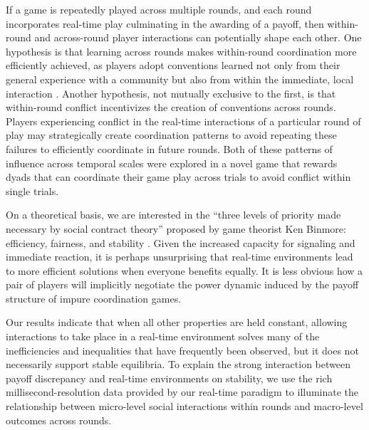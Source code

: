 \documentclass[10pt,letterpaper]{article}
\begin{document}
If a game is repeatedly played across multiple rounds, and each round incorporates real-time play culminating in the awarding of a payoff, then within-round and across-round player interactions can potentially shape each other. One hypothesis is that learning across rounds makes within-round coordination more efficiently achieved, as players adopt conventions learned not only from their general experience with a community \cite{JacksonXing14_CultureDependentStrategies} but also from within the immediate, local interaction \cite{FreyGoldstone13_CyclicGameDynamics, GarrodAnderson87_SayingWhatYouMean, BrennanClark96_ConceptualPactsConversation}. Another hypothesis, not mutually exclusive to the first, is that within-round conflict incentivizes the creation of conventions across rounds. Players experiencing conflict in the real-time interactions of a particular round of play may strategically create coordination patterns to avoid repeating these failures to efficiently coordinate in future rounds.  Both of these patterns of influence across temporal scales were explored in a novel game that rewards dyads that can coordinate their game play across trials to avoid conflict within single trials.

On a theoretical basis, we are interested in the ``three levels of priority made necessary by social contract theory'' proposed by game theorist Ken Binmore: efficiency, fairness, and stability \cite{Binmore05_NaturalJustice}. Given the increased capacity for signaling and immediate reaction, it is perhaps unsurprising that real-time environments lead to more efficient solutions when everyone benefits equally. It is less obvious how a pair of players will implicitly negotiate the power dynamic induced by the payoff structure of impure coordination games. 

Our results indicate that when all other properties are held constant, allowing interactions to take place in a real-time environment solves many of the inefficiencies and inequalities that have frequently been observed, but it does not necessarily support stable equilibria. To explain the strong interaction between payoff discrepancy and real-time environments on stability, we use the rich millisecond-resolution data provided by our real-time paradigm to illuminate the  relationship between micro-level social interactions within rounds and macro-level outcomes across rounds. 

\end{document}
